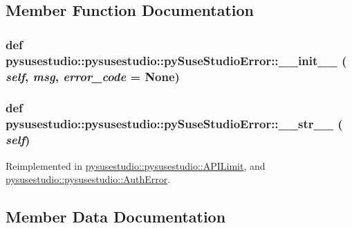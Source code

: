 \subsection{Member Function Documentation}
\hypertarget{classpysusestudio_1_1pysusestudio_1_1py_suse_studio_error_a2c3dab6ab38c0aaf5ab0b652d24644bc}{
\subsubsection[{\_\-\_\-init\_\-\_\-}]{\setlength{\rightskip}{0pt plus 5cm}def pysusestudio::pysusestudio::pySuseStudioError::\_\-\_\-init\_\-\_\- ( {\em self}, \/   {\em msg}, \/   {\em error\_\-code} = {\ttfamily None})}}
\label{classpysusestudio_1_1pysusestudio_1_1py_suse_studio_error_a2c3dab6ab38c0aaf5ab0b652d24644bc}
\hypertarget{classpysusestudio_1_1pysusestudio_1_1py_suse_studio_error_a117b0e3520484fdd941246f2a1bf9345}{
\subsubsection[{\_\-\_\-str\_\-\_\-}]{\setlength{\rightskip}{0pt plus 5cm}def pysusestudio::pysusestudio::pySuseStudioError::\_\-\_\-str\_\-\_\- ( {\em self})}}
\label{classpysusestudio_1_1pysusestudio_1_1py_suse_studio_error_a117b0e3520484fdd941246f2a1bf9345}


Reimplemented in \hyperlink{classpysusestudio_1_1pysusestudio_1_1_a_p_i_limit_a1276e9098dc88e6f270eb66149a219fa}{pysusestudio::pysusestudio::APILimit}, and \hyperlink{classpysusestudio_1_1pysusestudio_1_1_auth_error_ae39d2b39c5c736257a3352b13002c54a}{pysusestudio::pysusestudio::AuthError}.

\subsection{Member Data Documentation}
\hypertarget{classpysusestudio_1_1pysusestudio_1_1py_suse_studio_error_ad793aaac43eed7419fc64adfba1d2b0f}{
\subsubsection[{msg}]{}}
\label{classpysusestudio_1_1pysusestudio_1_1py_suse_studio_error_ad793aaac43eed7419fc64adfba1d2b0f}


